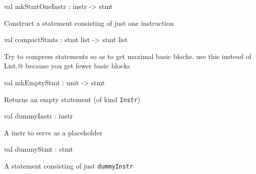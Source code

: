 \documentclass[11pt]{article}
\begin{document}
\label{val:Cil.mkStmtOneInstr}\begin{ocamldoccode}
val mkStmtOneInstr : instr -> stmt
\end{ocamldoccode}
\begin{ocamldocdescription}
Construct a statement consisting of just one instruction


\end{ocamldocdescription}




\label{val:Cil.compactStmts}\begin{ocamldoccode}
val compactStmts : stmt list -> stmt list
\end{ocamldoccode}
\begin{ocamldocdescription}
Try to compress statements so as to get maximal basic blocks.
 use this instead of List.@ because you get fewer basic blocks


\end{ocamldocdescription}




\label{val:Cil.mkEmptyStmt}\begin{ocamldoccode}
val mkEmptyStmt : unit -> stmt
\end{ocamldoccode}
\begin{ocamldocdescription}
Returns an empty statement (of kind {\tt{Instr}})


\end{ocamldocdescription}




\label{val:Cil.dummyInstr}\begin{ocamldoccode}
val dummyInstr : instr
\end{ocamldoccode}
\begin{ocamldocdescription}
A instr to serve as a placeholder


\end{ocamldocdescription}




\label{val:Cil.dummyStmt}\begin{ocamldoccode}
val dummyStmt : stmt
\end{ocamldoccode}
\begin{ocamldocdescription}
A statement consisting of just {\tt{dummyInstr}}


\end{ocamldocdescription}
\end{document}
